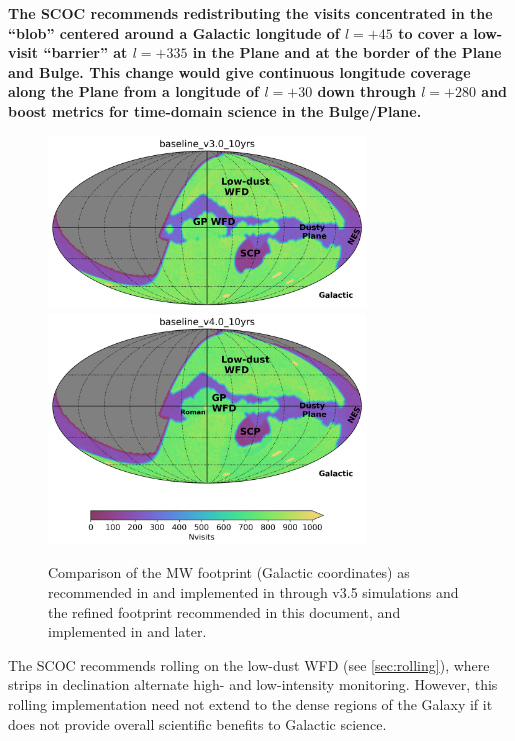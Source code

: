 {\bf The SCOC recommends redistributing the  visits concentrated in the ``blob'' centered around a Galactic longitude of $l=+45$ to cover a low-visit ``barrier'' at $l=+335$ in the Plane and at the border of the Plane and Bulge. This change would give continuous longitude coverage along the Plane from a longitude of $l=+30$ down through $l=+280$ and boost metrics for time-domain science in the Bulge/Plane.}


\begin{figure}
\centering
    \includegraphics[width=0.75\textwidth]{figures/baseline_v3_0_10yrs_nvisits_galactic.png}
    \includegraphics[width=0.75\textwidth]{figures/baseline_v4_0_10yrs_nvisits_galactic.png}
    \caption{Comparison of the MW footprint (Galactic coordinates) as recommended in  and implemented in  through v3.5 simulations and the refined footprint recommended in this document, and implemented in  and later.}\label{fig:gpfootprint}
\end{figure}

The SCOC recommends rolling on the low-dust WFD (see \autoref{sec:rolling}), where strips in declination alternate high- and low-intensity monitoring. 
However, this rolling implementation need not extend to the dense regions of the Galaxy if it does not provide overall scientific benefits to Galactic science.

